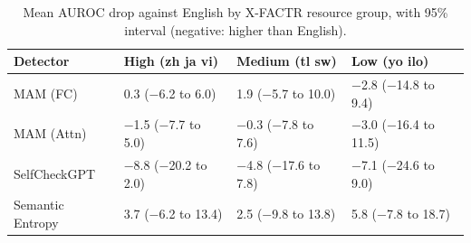 \begin{table}[!ht]
\tablestyle
\caption{Mean AUROC drop against English by X-FACTR resource group, with 95\% interval (negative: higher than English).}\label{tab:groups}
\begin{tabular}{llll}
\textbf{Detector} & \textbf{High (zh ja vi)} & \textbf{Medium (tl sw)} & \textbf{Low (yo ilo)} \\
\hline
MAM (FC) & 0.3 (−6.2 to 6.0) & 1.9 (−5.7 to 10.0) & −2.8 (−14.8 to 9.4) \\
\hline
MAM (Attn) & −1.5 (−7.7 to 5.0) & −0.3 (−7.8 to 7.6) & −3.0 (−16.4 to 11.5) \\
\hline
SelfCheckGPT & −8.8 (−20.2 to 2.0) & −4.8 (−17.6 to 7.8) & −7.1 (−24.6 to 9.0) \\
\hline
Semantic Entropy & 3.7 (−6.2 to 13.4) & 2.5 (−9.8 to 13.8) & 5.8 (−7.8 to 18.7)
\end{tabular}
\end{table}
